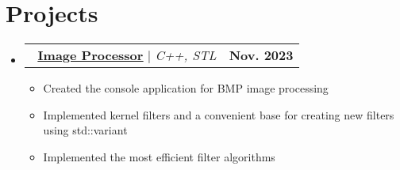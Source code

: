 \documentclass[letterpaper,11pt]{article}
\makeatletter
\newcommand{\resumeItem}[1]{
  \item\small{
    {#1 \vspace{-2pt}}
  }
}
\newcommand{\resumeSubheading}[4]{
  \vspace{-2pt}\item
    \begin{tabular*}{1.0\textwidth}[t]{l@{\extracolsep{\fill}}r}
      \textbf{#1} & \textbf{\small #2} \\
      \textit{\small#3} & \textit{\small #4} \\
    \end{tabular*}\vspace{-7pt}
}
\newcommand{\resumeProjectHeading}[2]{
    \item
    \begin{tabular*}{1.001\textwidth}{l@{\extracolsep{\fill}}r}
      \small#1 & \textbf{\small #2}\\
    \end{tabular*}\vspace{-7pt}
}
\newcommand{\resumeSubHeadingListStart}{\begin{itemize}[leftmargin=0.0in, label={}]}
\newcommand{\resumeSubHeadingListEnd}{\end{itemize}}
\newcommand{\resumeItemListStart}{\begin{itemize}}
\newcommand{\resumeItemListEnd}{\end{itemize}\vspace{-5pt}}
\makeatother
\begin{document}




\section{Projects}
    \vspace{-5pt}
    \resumeSubHeadingListStart
          \resumeProjectHeading
          {\textbf{\faGithub \, \href{https://github.com/tlidzhiev/bmp-image-processor}{\underline{Image Processor}}} $|$ \emph{C++, STL}}{Nov. 2023}
          \resumeItemListStart
            \resumeItem{Created the console application for BMP image processing}
            \resumeItem{Implemented kernel filters and a convenient base for creating new filters using std::variant}
            \resumeItem{Implemented the most efficient filter algorithms}
          \resumeItemListEnd
    \resumeSubHeadingListEnd
\vspace{-15pt}
\end{document}
